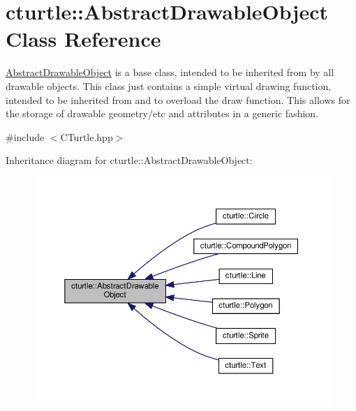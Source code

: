 \hypertarget{classcturtle_1_1AbstractDrawableObject}{}\section{cturtle\+:\+:Abstract\+Drawable\+Object Class Reference}
\label{classcturtle_1_1AbstractDrawableObject}


\hyperlink{classcturtle_1_1AbstractDrawableObject}{Abstract\+Drawable\+Object} is a base class, intended to be inherited from by all drawable objects. This class just contains a simple virtual drawing function, intended to be inherited from and to overload the draw function. This allows for the storage of drawable geometry/etc and attributes in a generic fashion.  




{\ttfamily \#include $<$C\+Turtle.\+hpp$>$}



Inheritance diagram for cturtle\+:\+:Abstract\+Drawable\+Object\+:\nopagebreak
\begin{figure}[H]
\begin{center}
\leavevmode
\includegraphics[width=350pt]{classcturtle_1_1AbstractDrawableObject__inherit__graph}
\end{center}
\end{figure}


